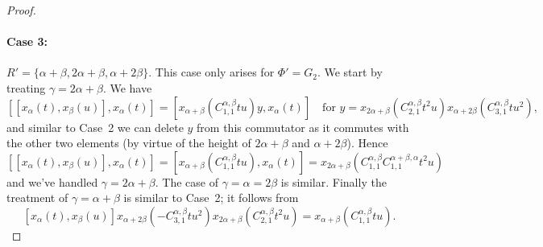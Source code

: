 \documentclass[11pt]{article}
\begin{document}
\begin{proof}
    \paragraph{Case 3:} $R' = \{\alpha+\beta, 2\alpha+\beta, \alpha+2\beta\}$. This case only arises for $\Phi' = G_2$. We start by treating $\gamma = 2\alpha+\beta$.  We have 
    \[
        [[x_\alpha(t),x_\beta(u)],x_\alpha(t)] = [x_{\alpha+\beta}(C_{1,1}^{\alpha,\beta}tu) y, x_\alpha(t)] \quad \text{for } y = x_{2\alpha+\beta}(C_{2,1}^{\alpha,\beta}t^2u)x_{\alpha+2\beta}(C_{3,1}^{\alpha,\beta}tu^2),
    \]
    and similar to Case~2 we can delete $y$ from this commutator as it commutes with the other two elements (by virtue of the height of $2\alpha+\beta$ and $\alpha + 2\beta$).  Hence
    \[
        [[x_\alpha(t),x_\beta(u)],x_\alpha(t)] =  [x_{\alpha+\beta}(C_{1,1}^{\alpha,\beta}tu), x_\alpha(t)] = x_{2\alpha+\beta}(C_{1,1}^{\alpha,\beta}C_{1,1}^{\alpha+\beta,\alpha}t^2u)
    \]
    and we've handled $\gamma = 2\alpha + \beta$. The case of $\gamma = \alpha = 2\beta$ is similar.  Finally the treatment of  $\gamma = \alpha + \beta$ is similar to Case~2; it follows from
    \[[x_\alpha(t),x_\beta(u)]x_{\alpha+2\beta}(-C_{3,1}^{\alpha,\beta}tu^2)x_{2\alpha+\beta}(C_{2,1}^{\alpha,\beta}t^2u) = x_{\alpha+\beta}(C_{1,1}^{\alpha,\beta}tu).\]


\end{proof}
\end{document}
